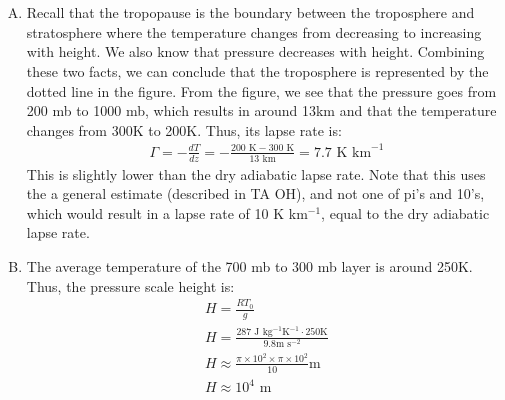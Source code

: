 \documentclass[11pt,a4paper,margin=1in]{article}
\begin{document}
\section{}
\begin{enumerate}[A.]
\item
    Recall that the tropopause is the boundary between the troposphere and 
    stratosphere where the temperature changes from decreasing to increasing
    with height. We also know that pressure decreases with height. Combining
    these two facts, we can conclude that the troposphere is represented by the
    dotted line in the figure. From the figure, we see that the pressure goes
    from 200 mb to 1000 mb, which results in around 13km and that the 
    temperature changes from 300K to 200K. Thus, its lapse rate is:
    \begin{gather*}
        \Gamma = -\frac{dT}{dz} = -\frac{200\text{ K} - 300 \text{ K}}
            {13\text{ km}} = 7.7 \text{ K km}^{-1}
    \end{gather*}
    This is slightly lower than the dry adiabatic lapse rate. Note that this
    uses the a general estimate (described in TA OH), and not one of pi's and
    10's, which would result in a lapse rate of 10 K km$^{-1}$, equal to the
    dry adiabatic lapse rate.
\item
    The average temperature of the 700 mb to 300 mb layer is around 250K. Thus, 
    the pressure scale height is:
    \begin{gather*}
        H = \frac{RT_0}{g}\\
        H = \frac{287 \text{ J kg}^{-1} \text{K}^{-1} \cdot 250 \text{K}}
            {9.8 \text{m s}^{-2}}\\
        H \approx \frac{\pi \times 10^2 \times \pi \times 10^2}{10} \text{m}\\
        H \approx 10^4 \text{ m} 
    \end{gather*}
\end{enumerate}
\end{document}
